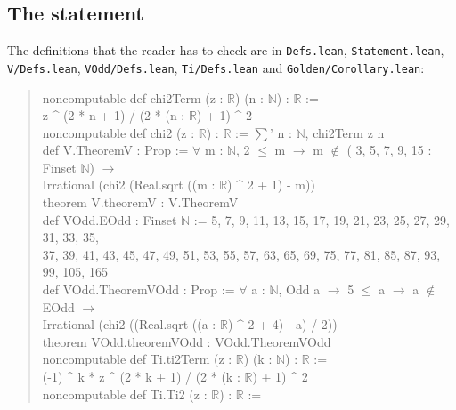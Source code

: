 \documentclass[11pt]{amsart}
\theoremstyle{definition}
\theoremstyle{remark}
\numberwithin{equation}{section}
\newcommand{\lean}[1]{{\def\_{\textunderscore\allowbreak}\texttt{#1}}}
\begin{document}
\subsection{The statement}
The definitions that the reader has to check are in \lean{Defs.lean}, \lean{Statement.lean},
\lean{V\slash{}Defs.lean}, \lean{VOdd\slash{}Defs.lean}, \lean{Ti\slash{}Defs.lean} and
\lean{Golden\slash{}Corollary.lean}:
\begin{quote}\ttfamily\footnotesize
noncomputable def chi2Term (z : $\mathbb{R}$) (n : $\mathbb{N}$) : $\mathbb{R}$ :=\\
\hspace*{2em}z \^{} (2 * n + 1) / (2 * (n : $\mathbb{R}$) + 1) \^{} 2\\[2pt]
noncomputable def chi2 (z : $\mathbb{R}$) : $\mathbb{R}$ := $\sum$' n : $\mathbb{N}$, chi2Term z n\\[2pt]
def V.TheoremV : Prop := $\forall$ m : $\mathbb{N}$, 2 $\le$ m $\to$ m $\notin$ ( 3, 5, 7, 9, 15 : Finset $\mathbb{N}$) $\to$\\
\hspace*{2em}Irrational (chi2 (Real.sqrt ((m : $\mathbb{R}$) \^{} 2 + 1) - m))\\[2pt]
theorem V.theoremV : V.TheoremV\\[2pt]
def VOdd.EOdd : Finset $\mathbb{N}$ :=  5, 7, 9, 11, 13, 15, 17, 19, 21, 23, 25, 27, 29, 31, 33, 35,\\
\hspace*{2em}37, 39, 41, 43, 45, 47, 49, 51, 53, 55, 57, 63, 65, 69, 75, 77, 81, 85, 87, 93,\\
\hspace*{2em}99, 105, 165\\[2pt]
def VOdd.TheoremVOdd : Prop := $\forall$ a : $\mathbb{N}$, Odd a $\to$ 5 $\le$ a $\to$ a $\notin$ EOdd $\to$\\
\hspace*{2em}Irrational (chi2 ((Real.sqrt ((a : $\mathbb{R}$) \^{} 2 + 4) - a) / 2))\\[2pt]
theorem VOdd.theoremVOdd : VOdd.TheoremVOdd\\[2pt]
noncomputable def Ti.ti2Term (z : $\mathbb{R}$) (k : $\mathbb{N}$) : $\mathbb{R}$ :=\\
\hspace*{2em}(-1) \^{} k * z \^{} (2 * k + 1) / (2 * (k : $\mathbb{R}$) + 1) \^{} 2\\[2pt]
noncomputable def Ti.Ti2 (z : $\mathbb{R}$) : $\mathbb{R}$ :=\\

\end{quote}
\end{document}
